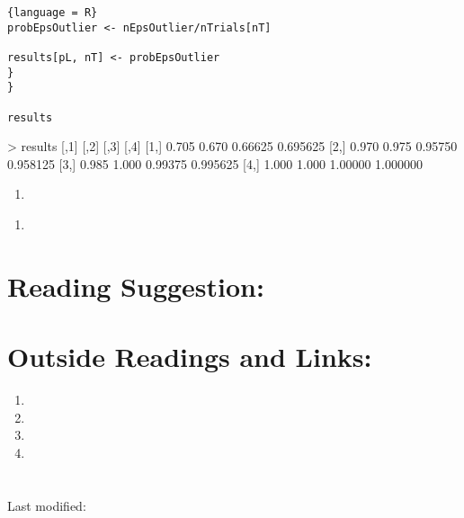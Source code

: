 \documentclass[12pt]{article}
\begin{document}
\begin{solution}
\begin{lstlisting}{language = R}
probEpsOutlier <- nEpsOutlier/nTrials[nT]

results[pL, nT] <- probEpsOutlier
}
}

results
  \end{lstlisting}

\begin{verbatim*}
  > results
      [,1]  [,2]    [,3]     [,4]
[1,] 0.705 0.670 0.66625 0.695625
[2,] 0.970 0.975 0.95750 0.958125
[3,] 0.985 1.000 0.99375 0.995625
[4,] 1.000 1.000 1.00000 1.000000
\end{verbatim*}

\end{solution}
\begin{exercise}
  \begin{enumerate}[label=(\alpha*)]
  \item 
  \end{enumerate}
\end{exercise}
\begin{solution}
  \begin{enumerate}[label=(\alpha*)]
  \item 
  \end{enumerate}
\end{solution}

\hr

\section*{Reading Suggestion:}




\hr

\section*{Outside Readings and Links:}
\begin{enumerate}
  \item  
  \item  
  \item  
  \item 
\end{enumerate}

\section*{\solutionsname}
\loadSolutions

\hr

\mydisclaim \myfooter

Last modified:  \flastmod
\end{document}
